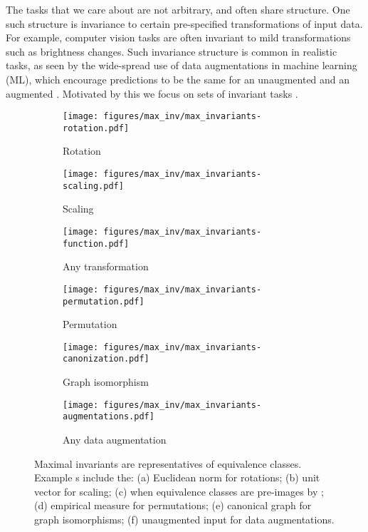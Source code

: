 \documentclass[final]{article}
\begin{document}
The tasks that we care about are not arbitrary, and often share structure. 
One such structure is invariance to certain pre-specified transformations of input data. For example, computer vision tasks are often invariant to mild transformations such as brightness changes.
Such invariance structure is common in realistic tasks, as seen by the wide-spread use  of data augmentations \cite{shorten_survey_2019} in machine learning (ML), which encourage predictions to be the same for an unaugmented  and an augmented .
Motivated by this we focus on sets of invariant tasks  .
\begin{figure}[t]
\centering
 \begin{subfigure}{0.30\linewidth}
\texttt{[image: figures/max\_inv/max\_invariants-rotation.pdf]}
\vspace*{-1.5em}
  \caption{Rotation}
 \label{fig:Mx_rot}
 \end{subfigure}
\quad
\begin{subfigure}{0.30\linewidth}
\texttt{[image: figures/max\_inv/max\_invariants-scaling.pdf]}
\vspace*{-1.5em}
  \caption{Scaling}
  \label{fig:Mx_scaling}
 \end{subfigure}
\quad
\begin{subfigure}{0.30\linewidth}
\texttt{[image: figures/max\_inv/max\_invariants-function.pdf]}
\vspace*{-1.5em}
  \caption{Any transformation }
  \label{fig:Mx_f}
 \end{subfigure}
\hfill
\begin{subfigure}{0.30\linewidth}
\texttt{[image: figures/max\_inv/max\_invariants-permutation.pdf]}
\vspace*{-1.5em}
  \caption{Permutation}
 \label{fig:Mx_perm}
 \end{subfigure}
\quad
\begin{subfigure}{0.30\linewidth}
\texttt{[image: figures/max\_inv/max\_invariants-canonization.pdf]}
\vspace*{-1.5em}
  \caption{Graph isomorphism }
  \label{fig:Mx_graph}
  \end{subfigure}
\quad
\begin{subfigure}{0.30\linewidth}
\texttt{[image: figures/max\_inv/max\_invariants-augmentations.pdf]}
\vspace*{-1.5em}
  \caption{Any data augmentation}
  \label{fig:Mx_aug}
  \end{subfigure}
\caption{Maximal invariants  are representatives of equivalence classes.
Example s include the: (a) Euclidean norm for rotations; (b)  unit vector for scaling; (c)  when equivalence classes are pre-images by ; (d) empirical measure for permutations; (e) canonical graph for graph isomorphisms; (f) unaugmented input for data augmentations.}
  \label{fig:max_inv}
\end{figure}
 
\end{document}
